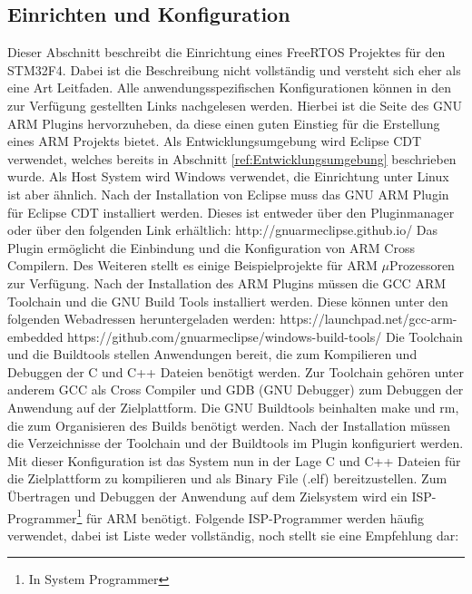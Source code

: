 \subsection{Einrichten und Konfiguration}
\label{sec:Einrichtung und Konfiguration}
Dieser Abschnitt beschreibt die Einrichtung eines FreeRTOS Projektes für den STM32F4. Dabei ist die Beschreibung nicht vollständig und versteht sich eher als eine Art Leitfaden. Alle anwendungsspezifischen Konfigurationen können in den zur Verfügung gestellten Links nachgelesen werden. Hierbei ist die Seite des GNU ARM Plugins hervorzuheben, da diese einen guten Einstieg für die Erstellung eines ARM Projekts bietet. Als Entwicklungsumgebung wird Eclipse CDT verwendet, welches bereits in Abschnitt \ref{ref:Entwicklungsumgebung} beschrieben wurde. Als Host System wird Windows verwendet, die Einrichtung unter Linux ist aber ähnlich. Nach der Installation von Eclipse muss das GNU ARM Plugin für Eclipse CDT installiert werden. Dieses ist entweder über den Pluginmanager oder über den folgenden Link erhältlich: 
\newline
\newline
http://gnuarmeclipse.github.io/
\newline
\newline
Das Plugin ermöglicht die Einbindung und die Konfiguration von ARM Cross Compilern. Des Weiteren stellt es einige Beispielprojekte für ARM $\mu$Prozessoren zur Verfügung. Nach der Installation des ARM Plugins müssen die GCC ARM Toolchain und die GNU Build Tools installiert werden. 
Diese können unter den folgenden Webadressen heruntergeladen werden: 
\newline
\newline
https://launchpad.net/gcc-arm-embedded
\newline
https://github.com/gnuarmeclipse/windows-build-tools/
\newline
\newline
Die Toolchain und die Buildtools stellen Anwendungen bereit, die zum Kompilieren und Debuggen der C und C++ Dateien benötigt werden. Zur Toolchain gehören unter anderem GCC als Cross Compiler und GDB (GNU Debugger) zum Debuggen der Anwendung auf der Zielplattform. Die GNU Buildtools beinhalten make und rm, die zum Organisieren des Builds benötigt werden. Nach der Installation müssen die Verzeichnisse der Toolchain und der Buildtools im Plugin konfiguriert werden. Mit dieser Konfiguration ist das System nun in der Lage C und C++ Dateien für die Zielplattform zu kompilieren und als Binary File (.elf) bereitzustellen. Zum Übertragen und Debuggen der Anwendung auf dem Zielsystem wird ein ISP-Programmer\footnote{In System Programmer} für ARM benötigt. Folgende ISP-Programmer werden häu\-fig verwendet, dabei ist Liste weder vollständig, noch stellt sie eine Empfehlung dar:
